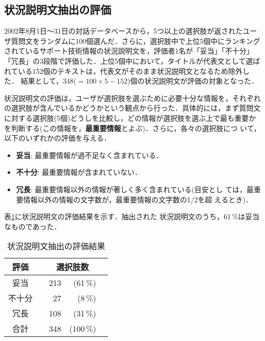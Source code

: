 \subsection{状況説明文抽出の評価}

2002年8月1日〜31日の対話データベースから，5つ以上の選択肢が返されたユー
ザ質問文をランダムに100個選んだ．さらに，選択肢中で上位5個中にランキング
されているサポート技術情報の状況説明文を，評価者1名が「妥当」「不十分」
「冗長」の3段階で評価した．上位5個中において，タイトルが代表文として選ば
れている152個のテキストは，代表文がそのまま状況説明文となるため除外した．
結果として，348($=100 \times 5 - 152$)個の状況説明文が評価の対象となった．

状況説明文の評価は，ユーザが選択肢を選ぶために必要十分な情報を，それぞれ
の選択肢が含んでいるかどうかという観点から行った．具体的には，まず質問文
に対する選択肢(5個)どうしを比較し，どの情報が選択肢を選ぶ上で最も重要か
を判断する(この情報を，{\bf 最重要情報}とよぶ)．さらに，各々の選択肢につ
いて，以下のいずれかの評価を与える．

\begin{itemize}
 \item {\bf 妥当}: 最重要情報が過不足なく含まれている．
 \item {\bf 不十分}: 最重要情報が含まれていない．
 \item {\bf 冗長}: 最重要情報以外の情報が著しく多く含まれている(目安とし
       ては，最重要情報以外の情報の文字数が，最重要情報の文字数の1/2を超
       えるとき)．
\end{itemize}


表\ref{tab:状況説明文抽出の評価}に状況説明文の評価結果を示す．抽出された
状況説明文のうち，61\,\%は妥当なものであった．

\begin{table}
 \caption{状況説明文抽出の評価結果} \label{tab:状況説明文抽出の評価}
 \begin{center} \footnotesize
  \begin{tabular}{c|p{5mm}@{}r@{ }r@{}p{5mm}} \hline
   評価 & \multicolumn{4}{c}{選択肢数} \\ \hline
   妥当       & & 213 & (61\,\%) & \\
   不十分     & &  27 &  (8\,\%) & \\
   冗長       & & 108 & (31\,\%) & \\ \hline
   合計       & & 348 & (100\,\%) & \\ \hline
  \end{tabular}
 \end{center}
\end{table}


